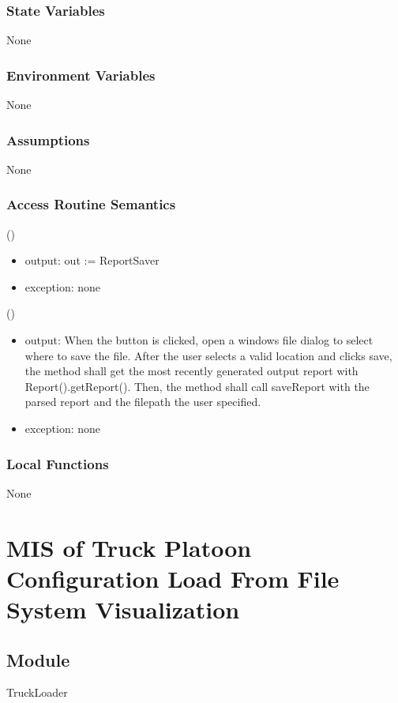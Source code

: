 \documentclass[12pt, titlepage]{article}
\begin{document}
\subsubsection{State Variables}
None
\subsubsection{Environment Variables}
None
\subsubsection{Assumptions}
None
\subsubsection{Access Routine Semantics}

()
\begin{itemize}
\item output: out :=  ReportSaver
\item exception: none
\end{itemize}

()
\begin{itemize}
\item output: When the button is clicked, open a windows file dialog to select where to save the file. After the user selects a valid location and clicks save, the method shall get the most recently generated output report with Report().getReport(). Then, the method shall call saveReport with the parsed report and the filepath the user specified.
\item exception: none
\end{itemize}

\subsubsection{Local Functions}
None

\newpage
\section{MIS of Truck Platoon Configuration Load From File System Visualization} \label{TruckLoader}

\subsection{Module}

TruckLoader
\end{document}
